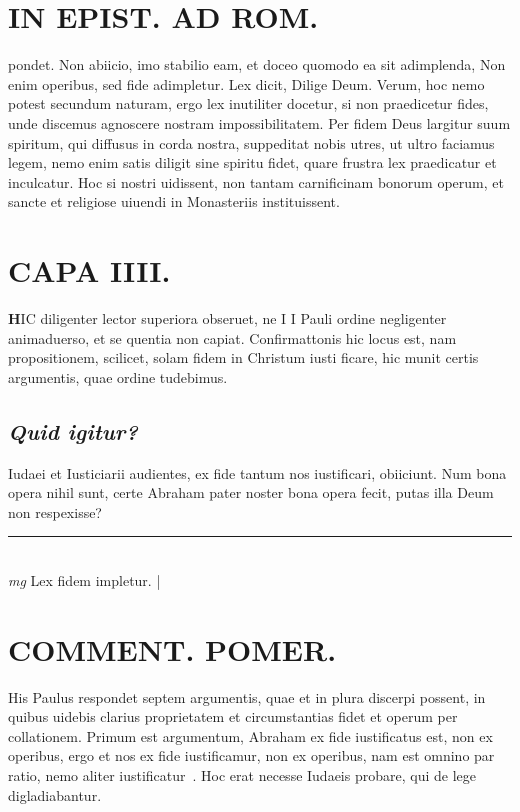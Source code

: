\documentclass{article}
\begin{document}
\begin{pages}
\section*{IN EPIST. AD ROM.  }
\marginpar{[ p.38 ]}\pstart pondet. Non abiicio, imo stabilio eam, et doceo quomodo ea sit adimplenda, Non enim operibus, sed fide adimpletur. Lex dicit, Dilige Deum. Verum, hoc nemo potest secundum naturam, ergo lex inutiliter docetur, si non praedicetur fides, unde discemus agnoscere nostram impossibilitatem. Per fidem Deus largitur suum spiritum, qui diffusus in corda nostra, suppeditat nobis utres, ut ultro faciamus legem, nemo enim satis diligit sine spiritu fidet, quare frustra lex praedicatur et inculcatur. Hoc si nostri uidissent, non tantam carnificinam bonorum operum, et sancte et religiose uiuendi in Monasteriis instituissent.   \pend
\endnumbering\beginnumbering\section{CAPA IIII.}\pstart \huge\textbf{H}\normalsize IC diligenter lector superiora obseruet, ne I I Pauli ordine negligenter animaduerso, et se quentia non capiat. Confirmattonis hic locus est, nam propositionem, scilicet, solam fidem in Christum iusti ficare, hic munit certis argumentis, quae ordine tudebimus.   \pend
{}
{}
\subsection*{\textit{Quid igitur? }}\pstart Iudaei et Iusticiarii audientes, ex fide tantum nos iustificari, obiiciunt. Num bona opera nihil sunt, certe Abraham pater noster bona opera fecit, putas illa Deum non respexisse?  \pend
\vspace{0.5cm}\noindent
\vspace{0.2cm}\rule{1cm}{0.2pt}\\ 
\hspace{0.2cm}\textit{mg}
\footnotesize Lex fidem impletur.  
\normalsize| 
\section*{COMMENT. POMER.  }\pstart His Paulus respondet septem argumentis, quae et in plura discerpi possent, in quibus uidebis clarius proprietatem et circumstantias fidet et operum per collationem.  \pend\pstart Primum est argumentum, Abraham ex fide iustificatus est, non ex operibus, ergo et nos ex fide iustificamur, non ex operibus, nam est omnino par ratio, nemo aliter iustificatur . Hoc erat necesse Iudaeis probare, qui de lege digladiabantur.  \pend
{}
{}

\end{pages}
\end{document}
